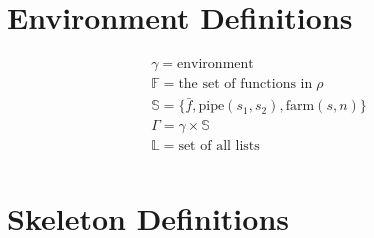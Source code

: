 \documentclass{article}
\begin{document}
\section{Environment Definitions}

\[
  \begin{array}{l}
    \gamma = \text{environment} \\
    \mathbb{F} = \text{the set of functions in}\; \rho \\
    \mathbb{S} = \{\bar{f}, \mathrm{pipe}(s_1, s_2), \mathrm{farm}(s, n)\} \\
    \Gamma = \gamma \times \mathbb{S} \\
    \mathbb{L} = \text{set of all lists} \\
  \end{array}
\]

\section{Skeleton Definitions}
\end{document}
